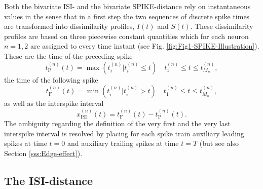 \documentclass[10pt,twocolumn]{elsart5p}
\begin{document}
Both the bivariate ISI- and the bivariate SPIKE-distance rely on instantaneous values in the sense that in a first step the two sequences of discrete spike times are transformed into dissimilarity profiles, $I (t)$ and $S (t)$. These dissimilarity profiles are based on three piecewise constant quantities which for each neuron $n = 1, 2$ are assigned to every time instant (see Fig. \ref{fig:Fig1-SPIKE-Illustration}). These are the time of the preceding spike
%
\begin{equation} \label{eq:Prev-Spike}
    t_{\mathrm {P}}^{(n)} (t) = \max(t_i^{(n)} | t_i^{(n)} \leq t)  \quad t_1^{(n)} \leq t \leq t_{M_n}^{(n)},
\end{equation}
%
the time of the following spike
%
\begin{equation} \label{eq:Foll-Spike}
    t_{\mathrm {F}}^{(n)} (t) = \min(t_i^{(n)} | t_i^{(n)} > t)  \quad t_1^{(n)} \leq t \leq t_{M_n}^{(n)},
\end{equation}
%
as well as the interspike interval
%
\begin{equation} \label{eq:ISI}
    x_{\mathrm {ISI}}^{(n)} (t) = t_{\mathrm {F}}^{(n)} (t) - t_{\mathrm {P}}^{(n)} (t).
\end{equation}
%
The ambiguity regarding the definition of the very first and the very last interspike interval is resolved by placing for each spike train auxiliary leading spikes at time $t = 0$ and auxiliary trailing spikes at time $t = T$ (but see also Section \ref{sss:Edge-effect}).


\subsection{\label{ss:ISI-Distance} The ISI-distance}
\end{document}
